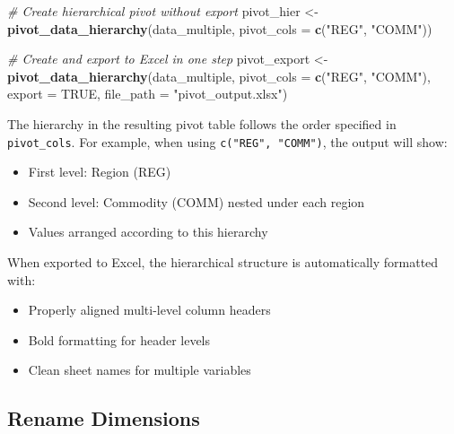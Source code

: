 \documentclass[
]{article}
\newenvironment{Shaded}{\begin{snugshade}}{\end{snugshade}}
\newcommand{\AttributeTok}[1]{\textcolor[rgb]{0.13,0.29,0.53}{#1}}
\newcommand{\CommentTok}[1]{\textcolor[rgb]{0.56,0.35,0.01}{\textit{#1}}}
\newcommand{\ConstantTok}[1]{\textcolor[rgb]{0.56,0.35,0.01}{#1}}
\newcommand{\FunctionTok}[1]{\textcolor[rgb]{0.13,0.29,0.53}{\textbf{#1}}}
\newcommand{\NormalTok}[1]{#1}
\newcommand{\OtherTok}[1]{\textcolor[rgb]{0.56,0.35,0.01}{#1}}
\newcommand{\StringTok}[1]{\textcolor[rgb]{0.31,0.60,0.02}{#1}}
\providecommand{\tightlist}{%
  \setlength{\itemsep}{0pt}\setlength{\parskip}{0pt}}
\begin{document}
\begin{Shaded}
\begin{Highlighting}[]
\CommentTok{\# Create hierarchical pivot without export}
\NormalTok{pivot\_hier }\OtherTok{\textless{}{-}} \FunctionTok{pivot\_data\_hierarchy}\NormalTok{(data\_multiple, }
                                  \AttributeTok{pivot\_cols =} \FunctionTok{c}\NormalTok{(}\StringTok{"REG"}\NormalTok{, }\StringTok{"COMM"}\NormalTok{))}

\CommentTok{\# Create and export to Excel in one step}
\NormalTok{pivot\_export }\OtherTok{\textless{}{-}} \FunctionTok{pivot\_data\_hierarchy}\NormalTok{(data\_multiple, }
                                   \AttributeTok{pivot\_cols =} \FunctionTok{c}\NormalTok{(}\StringTok{"REG"}\NormalTok{, }\StringTok{"COMM"}\NormalTok{),}
                                   \AttributeTok{export =} \ConstantTok{TRUE}\NormalTok{,}
                                   \AttributeTok{file\_path =} \StringTok{"pivot\_output.xlsx"}\NormalTok{)}
\end{Highlighting}
\end{Shaded}

The hierarchy in the resulting pivot table follows the order specified
in \texttt{pivot\_cols}. For example, when using
\texttt{c("REG",\ "COMM")}, the output will show:

\begin{itemize}
\tightlist
\item
  First level: Region (REG)\\
\item
  Second level: Commodity (COMM) nested under each region
\item
  Values arranged according to this hierarchy
\end{itemize}

When exported to Excel, the hierarchical structure is automatically
formatted with:

\begin{itemize}
\tightlist
\item
  Properly aligned multi-level column headers
\item
  Bold formatting for header levels\\
\item
  Clean sheet names for multiple variables
\end{itemize}

\subsection{Rename Dimensions}\label{rename-dimensions}
\end{document}
